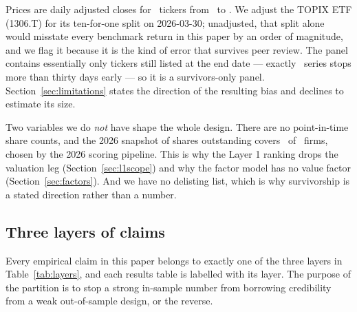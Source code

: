 \documentclass[a4paper,11pt]{article}
\begin{document}
Prices are daily adjusted closes for \SurvTickers\ tickers from \SurvStart\ to \SurvEnd. We adjust
the TOPIX ETF (1306.T) for its ten-for-one split on 2026-03-30; unadjusted, that split alone would
misstate every benchmark return in this paper by an order of magnitude, and we flag it because it is
the kind of error that survives peer review. The panel contains essentially only tickers still
listed at the end date --- exactly \SurvStopped\ series stops more than thirty days early --- so it is
a survivors-only panel. Section~\ref{sec:limitations} states the direction of the resulting bias and
declines to estimate its size.

Two variables we do \emph{not} have shape the whole design. There are no point-in-time share counts,
and the 2026 snapshot of shares outstanding covers \SatShareCount\ of \SatFirms\ firms, chosen by the
2026 scoring pipeline. This is why the Layer 1 ranking drops the valuation leg
(Section~\ref{sec:l1scope}) and why the factor model has no value factor
(Section~\ref{sec:factors}). And we have no delisting list, which is why survivorship is a stated
direction rather than a number.

\subsection{Three layers of claims}\label{sec:layers}

Every empirical claim in this paper belongs to exactly one of the three layers in
Table~\ref{tab:layers}, and each results table is labelled with its layer. The purpose of the
partition is to stop a strong in-sample number from borrowing credibility from a weak
out-of-sample design, or the reverse.
\end{document}
